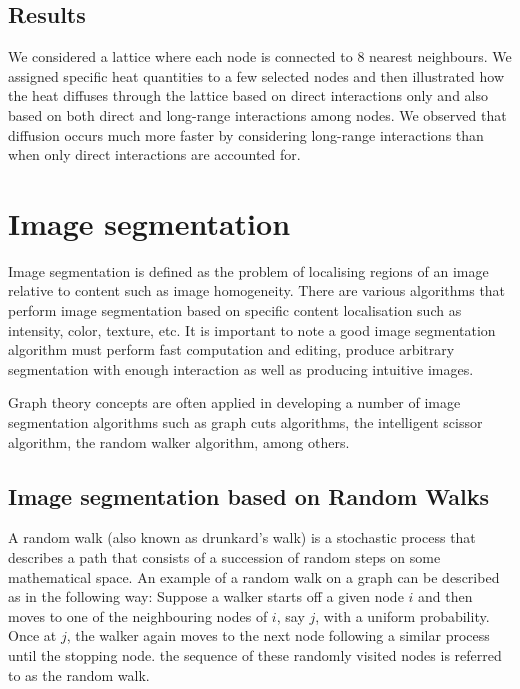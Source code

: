 \documentclass[10pt,a4paper]{article}
\begin{document}
        \subsection{Results}
        
        We considered a lattice where each node is connected to $8$ nearest neighbours. We assigned specific heat quantities to a few selected nodes and then illustrated how the heat diffuses through the lattice based on direct interactions only and also based on both direct and long-range interactions among nodes.
        We observed that diffusion occurs much more faster by considering long-range interactions than when only direct interactions are accounted for. 
        
    
\newpage
\section{Image segmentation}
Image segmentation is defined as the problem of localising regions of an image relative to content such as image homogeneity. There are various algorithms that perform image segmentation based on specific content localisation such as intensity, color, texture, etc.
It is important to note a good image segmentation algorithm must perform fast computation and editing, produce arbitrary segmentation with enough interaction as well as producing intuitive images. 

Graph theory concepts are often applied in developing a number of image segmentation algorithms such as graph cuts algorithms, the intelligent scissor algorithm, the random walker algorithm, among others.

\subsection{Image segmentation based on Random Walks}
A random walk (also known as drunkard's walk) is a stochastic process that describes a path that consists of a succession of random steps on some mathematical space. An example of a random walk on a graph can be described as  in the following way:
Suppose a walker starts off a given node $i$ and then moves to one of the neighbouring nodes of $i$, say $j$, with a uniform probability. Once at $j$, the walker again moves to the next node following a similar process until the stopping node. the sequence of these randomly visited nodes is referred to as the random walk.
\end{document}
